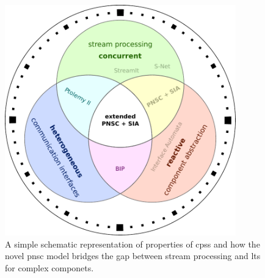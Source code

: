 \begin{figure}[bht]
    \TopFigSpace
    \vspace{2mm}
    \centering
    \includegraphics[width=10cm]{fig/trinity.pdf}
    \CaptionFigSpace
    \vspace{2mm}
    \caption{A simple schematic representation of properties of \glspl{cps} and how the novel \gls{pnsc} model bridges the gap between stream processing and \gls{lts} for complex componets.}
    \label{fig_trinity}
    \BotFigSpace
\end{figure}

